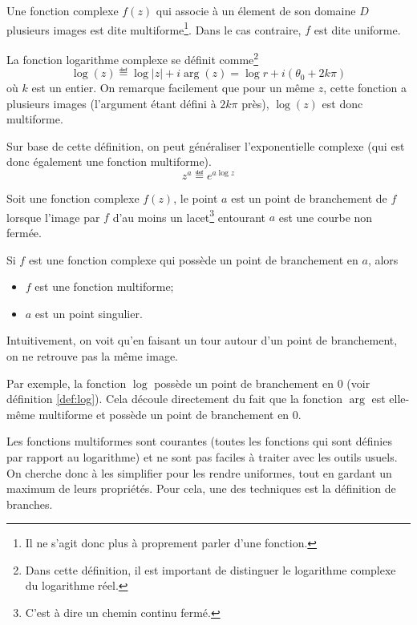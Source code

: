\begin{mydef}
	Une fonction complexe $f(z)$ qui associe à un élement de son
	domaine $D$ plusieurs images est dite multiforme\footnote{Il
	ne s'agit donc plus à proprement parler d'une fonction.}. Dans
	le cas contraire, $f$ est dite uniforme.
\end{mydef}

\begin{mydef}\label{def:log}
	La fonction logarithme complexe se définit comme\footnote{Dans cette
	définition, il est important de distinguer le logarithme complexe
	du logarithme réel.}
	$$\log(z) \eqdef \log|z| + i\arg(z) = \log r + i(\theta_0 + 2k\pi)$$
	où $k$ est un entier. On remarque facilement que pour un même $z$,
	cette fonction a plusieurs images (l'argument étant défini à $2k\pi$
	près), $\log(z)$ est donc multiforme.
\end{mydef}

Sur base de cette définition, on peut généraliser l'exponentielle
complexe (qui est donc également une fonction multiforme).
\[z^a \eqdef e^{a\log z}\]


\begin{mydef}
	Soit une fonction complexe $f(z)$, 
	le point $a$ est un point de branchement de $f$ lorsque
	l'image par $f$ d'au moins un lacet\footnote{C'est à dire un chemin
	continu fermé.} entourant $a$ est une courbe non fermée.
\end{mydef}

\begin{myprop}
    Si $f$ est une fonction complexe qui possède un
    point de branchement en $a$, alors
    \begin{itemize}
        \item $f$ est une fonction multiforme;
        \item $a$ est un point singulier.
    \end{itemize}
\end{myprop}

Intuitivement, on voit qu'en \og faisant un tour \fg autour d'un point
de branchement, on ne \og retrouve \fg pas la même image.

Par exemple, la fonction $\log$ possède un point de branchement
en $0$ (voir définition \ref{def:log}).
Cela découle directement du fait que la fonction $\arg$ est elle-même
multiforme et possède un point de branchement en $0$.

Les fonctions multiformes sont courantes
(toutes les fonctions qui sont définies par rapport au logarithme)
et ne sont pas faciles à traiter avec les outils usuels.
On cherche donc à les simplifier pour les rendre uniformes, tout en
gardant un maximum de leurs propriétés. Pour cela, une des techniques
est la définition de branches.

